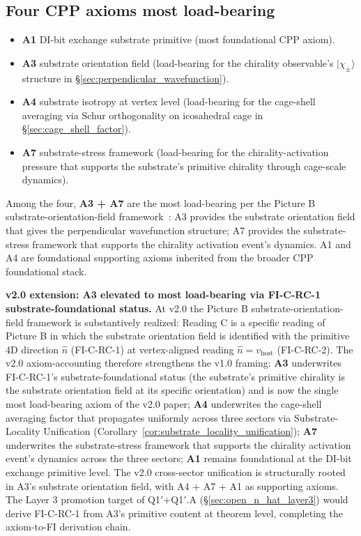 \documentclass[11pt,letterpaper]{article}
\begin{document}
\subsection{Four CPP axioms most load-bearing}\label{sec:four_axioms}

\begin{itemize}\setlength\itemsep{0.2em}
    \item \textbf{A1} DI-bit exchange substrate primitive (most foundational CPP axiom).
    \item \textbf{A3} substrate orientation field (load-bearing for the chirality observable's $|\chi_\pm\rangle$ structure in \S\ref{sec:perpendicular_wavefunction}).
    \item \textbf{A4} substrate isotropy at vertex level (load-bearing for the cage-shell averaging via Schur orthogonality on icosahedral cage in \S\ref{sec:cage_shell_factor}).
    \item \textbf{A7} substrate-stress framework (load-bearing for the chirality-activation pressure that supports the substrate's primitive chirality through cage-scale dynamics).
\end{itemize}

Among the four, \textbf{A3 + A7} are the most load-bearing per the Picture B substrate-orientation-field framework~\cite{abshier_capotauro_closure_sketch}: A3 provides the substrate orientation field that gives the perpendicular wavefunction structure; A7 provides the substrate-stress framework that supports the chirality activation event's dynamics. A1 and A4 are foundational supporting axioms inherited from the broader CPP foundational stack.

\textbf{v2.0 extension: A3 elevated to most load-bearing via FI-C-RC-1 substrate-foundational status.} At v2.0 the Picture B substrate-orientation-field framework is substantively realized: Reading C is a specific reading of Picture B in which the substrate orientation field is identified with the primitive 4D direction $\hat{n}$ (FI-C-RC-1) at vertex-aligned reading $\hat{n} = v_{\text{host}}$ (FI-C-RC-2). The v2.0 axiom-accounting therefore strengthens the v1.0 framing: \textbf{A3} underwrites FI-C-RC-1's substrate-foundational status (the substrate's primitive chirality is the substrate orientation field at its specific orientation) and is now the single most load-bearing axiom of the v2.0 paper; \textbf{A4} underwrites the cage-shell averaging factor that propagates uniformly across three sectors via Substrate-Locality Unification (Corollary~\ref{cor:substrate_locality_unification}); \textbf{A7} underwrites the substrate-stress framework that supports the chirality activation event's dynamics across the three sectors; \textbf{A1} remains foundational at the DI-bit exchange primitive level. The v2.0 cross-sector unification is structurally rooted in A3's substrate orientation field, with A4 + A7 + A1 as supporting axioms. The Layer 3 promotion target of Q1$'$+Q1$'$.A (\S\ref{sec:open_n_hat_layer3}) would derive FI-C-RC-1 from A3's primitive content at theorem level, completing the axiom-to-FI derivation chain.
\end{document}
